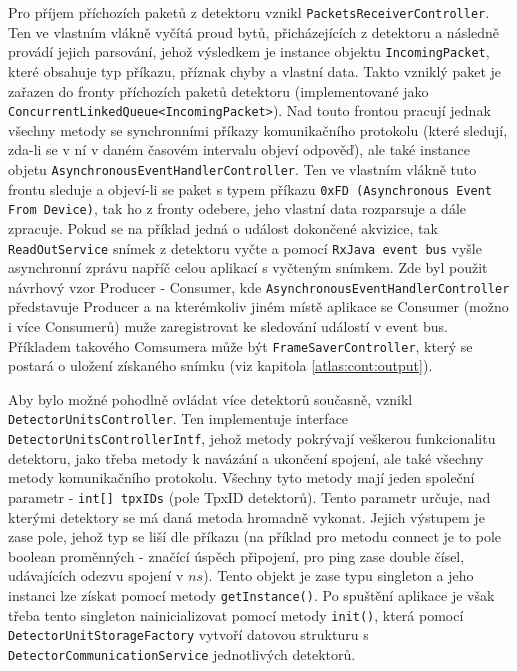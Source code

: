 Pro příjem příchozích paketů z detektoru vznikl \texttt{PacketsReceiverController}. Ten ve vlastním vlákně vyčítá proud bytů, přicházejících z detektoru a následně provádí jejich parsování, jehož výsledkem je instance objektu \texttt{IncomingPacket}, které obsahuje typ příkazu, příznak chyby a vlastní data. Takto vzniklý paket je zařazen do fronty příchozích paketů detektoru (implementované jako \texttt{ConcurrentLinkedQueue<IncomingPacket>}). Nad touto frontou pracují jednak všechny metody se synchronními příkazy komunikačního protokolu (které sledují, zda-li se v ní v daném časovém intervalu objeví odpověď), ale také instance objetu \texttt{AsynchronousEventHandlerController}. Ten ve vlastním vlákně tuto frontu sleduje a objeví-li se paket s typem příkazu \texttt{0xFD (Asynchronous Event From Device)}, tak ho z fronty odebere, jeho vlastní data rozparsuje a dále zpracuje. Pokud se na příklad jedná o událost dokončené akvizice, tak \texttt{ReadOutService} snímek z detektoru vyčte a pomocí \texttt{RxJava event bus} vyšle asynchronní zprávu napříč celou aplikací s vyčteným snímkem. Zde byl použit návrhový vzor Producer - Consumer, kde \texttt{AsynchronousEventHandlerController} představuje Producer a na kterémkoliv jiném místě aplikace se Consumer (možno i více Consumerů) muže zaregistrovat ke sledování událostí v event bus. Příkladem takového Comsumera může být \texttt{FrameSaverController}, který se postará o uložení získaného snímku (viz kapitola \ref{atlas:cont:output}).

Aby bylo možné pohodlně ovládat více detektorů současně, vznikl\\\texttt{DetectorUnitsController}. Ten implementuje interface \texttt{DetectorUnitsControllerIntf}, jehož metody pokrývají veškerou funkcionalitu detektoru, jako třeba metody k navázání a ukončení spojení, ale také všechny metody komunikačního protokolu. Všechny tyto metody mají jeden společní parametr - \texttt{int[] tpxIDs} (pole TpxID detektorů). Tento parametr určuje, nad kterými detektory se má daná metoda hromadně vykonat. Jejich výstupem je zase pole, jehož typ se liší dle příkazu (na příklad pro metodu connect je to pole boolean proměnných - značící úspěch připojení, pro ping zase double čísel, udávajících odezvu spojení v $ns$). Tento objekt je zase typu singleton a jeho instanci lze získat pomocí metody \texttt{getInstance()}. Po spuštění aplikace je však třeba tento singleton nainicializovat pomocí metody \texttt{init()}, která pomocí \texttt{DetectorUnitStorageFactory} vytvoří datovou strukturu  s \texttt{DetectorCommunicationService} jednotlivých detektorů.


